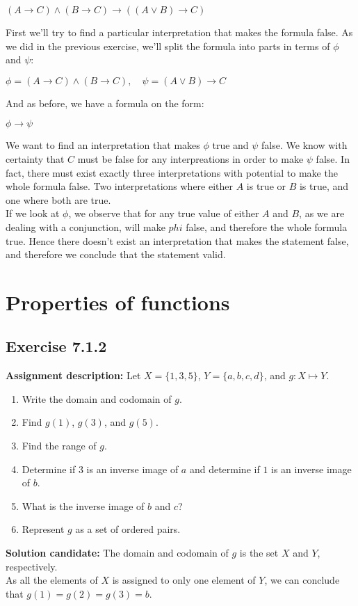 \documentclass{report}
\newcommand{\cent}[1]{\begin{center}#1\end{center}}
\newcommand{\assignmentDescription}{\textbf{Assignment description: }}
\newcommand{\solution}{\textbf{Solution candidate: }}
\newcommand{\Section}[1]{\section{#1}}
\newcommand{\Exercise}[1]{\subsection{Exercise #1}}
\newcommand{\defaultEnumerateLabel}{\textbf{\alph*.}}
\begin{document}
\begin{enumerate}
 		\cent{$(A \to C) \wedge (B \to C) \to ((A \vee B) \to C)$}
 		
 		First we'll try to find a particular interpretation that makes the formula false. As we did in the previous exercise, we'll split the formula into parts in terms of $\phi$ and $\psi$:
 		
 		\cent{$\phi = (A \to C) \wedge (B \to C), \quad \psi = (A \vee B) \to C $}
 		
 		And as before, we have a formula on the form:
 		
 		\cent{$\phi \to \psi$}
 		
 		We want to find an interpretation that makes $\phi$ true and $\psi$ false. We know with certainty that $C$ must be false for any interpreations in order to make $\psi$ false. In fact, there must exist exactly three interpretations with potential to make the whole formula false. Two interpretations where either $A$ is true or $B$ is true, and one where both are true.\\
 		
 		If we look at $\phi$, we observe that for any true value of either $A$ and $B$, as we are dealing with a conjunction, will make $phi$ false, and therefore the whole formula true. Hence there doesn't exist an interpretation that makes the statement false, and therefore we conclude that the statement valid.
 	\end{enumerate}
 \Section{Properties of functions}
 	\Exercise{7.1.2}
 	
 	\assignmentDescription 
 	Let $X = \{1,3,5\}$, $Y = \{a,b,c,d\}$, and $g : X \mapsto Y$.
 	
 	\begin{enumerate}[label=\defaultEnumerateLabel]
 		\item Write the domain and codomain of $g$.
 		\item Find $g(1)$, $g(3)$, and $g(5)$.
 		\item Find the range of $g$.
 		\item Determine if 3 is an inverse image of $a$ and determine if $1$ is an inverse image of $b$.
 		\item What is the inverse image of $b$ and $c$?
 		\item Represent $g$ as a set of ordered pairs.
 	\end{enumerate}
 
 	\solution
 	The domain and codomain of $g$ is the set $X$ and $Y$, respectively.\\
 	
 	As all the elements of $X$ is assigned to only one element of $Y$, we can conclude that $g(1) = g(2) = g(3) = b$.\\
 	
\end{document}
